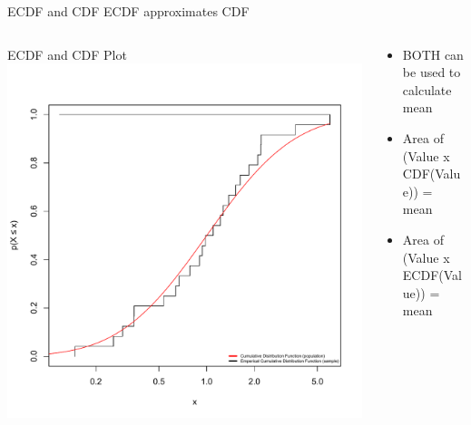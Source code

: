 \documentclass{beamer}
\begin{document}
\begin{frame}{ECDF and CDF}
ECDF approximates CDF	
\begin{columns}    
	\begin{column}{4cm}        
		\begin{center}
		ECDF and CDF Plot           
	 	\includegraphics[width=1.0\textwidth]{Figure5}        
		\end{center}   
	 \end{column}    
	\begin{column}{5cm}        
	  
	\begin{itemize}
	\item BOTH can be used to calculate mean
	\item Area of (Value x CDF(Value)) = mean
	\item Area of (Value x ECDF(Value)) = mean
	\end{itemize}
	\end{column}
	\end{columns}

\end{frame}
\end{document}
